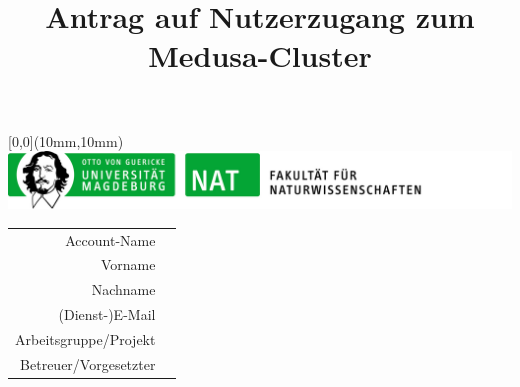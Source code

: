 \documentclass[paper=a4]{scrartcl}
\title{Antrag auf Nutzerzugang zum Medusa-Cluster}
\date{}
\begin{document}
\maketitle
\thispagestyle{empty}
\begin{textblock*}{\linewidth}[0,0](10mm,10mm)%
  \includegraphics[width=\linewidth]{unibrief_logo_nat.png}%
\end{textblock*}

\vspace{-2.5cm}
\setlength{\extrarowheight}{1cm}

\begin{tabular}[]{rl}
  Account-Name & \uline{\hspace{10cm}} \\
  Vorname & \uline{\hspace{10cm}} \\
  Nachname & \uline{\hspace{10cm}} \\
  (Dienst-)E-Mail & \uline{\hspace{10cm}} \\
  Arbeitsgruppe/Projekt & \uline{\hspace{10cm}} \\
  Betreuer/Vorgesetzter & \uline{\hspace{10cm}} \\
\end{tabular}
\end{document}
